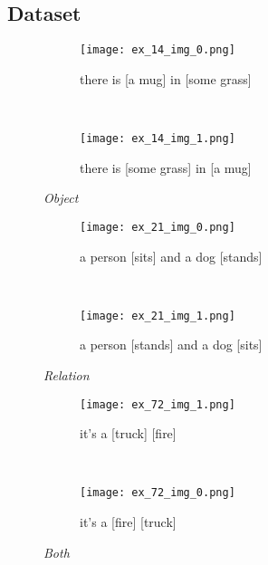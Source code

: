 \documentclass[10pt,twocolumn,letterpaper]{article}
\begin{document}
\subsection{Dataset}
\begin{figure}
    \centering
        \begin{minipage}[t]{.15\textwidth}
            \begin{subfigure}[t]{\textwidth}
            \centering
            \texttt{[image: ex\_14\_img\_0.png]}
            \caption{there is [a mug] in [some grass]}
            \end{subfigure}\\
            \begin{subfigure}[t]{\textwidth}
            \centering
            \texttt{[image: ex\_14\_img\_1.png]}
            \caption{there is [some grass] in [a mug]}
            \end{subfigure}\caption*{\textit{Object}}
        \end{minipage}
        \hfill
        \begin{minipage}[t]{.15\textwidth}
            \begin{subfigure}[t]{\textwidth}
            \centering
            \texttt{[image: ex\_21\_img\_0.png]}
            \caption{a person [sits] and a dog [stands]}
            \end{subfigure}\\
            \begin{subfigure}[t]{\textwidth}
            \centering
            \texttt{[image: ex\_21\_img\_1.png]}
            \caption{a person [stands] and a dog [sits]}
            \end{subfigure}\caption*{\textit{Relation}}
        \end{minipage}
        \hfill
        \begin{minipage}[t]{.15\textwidth}
            \begin{subfigure}[t]{\textwidth}
            \centering
            \texttt{[image: ex\_72\_img\_1.png]}
            \caption{it's a [truck] [fire]}
            \end{subfigure}\\
            \vspace{9pt}
            \begin{subfigure}[t]{\textwidth}
            \centering
            \texttt{[image: ex\_72\_img\_0.png]}
            \caption{it's a [fire] [truck]}
            \end{subfigure}\vspace{9pt}
            \caption*{\textit{Both}}
        \end{minipage}\end{figure}
    
\end{document}
